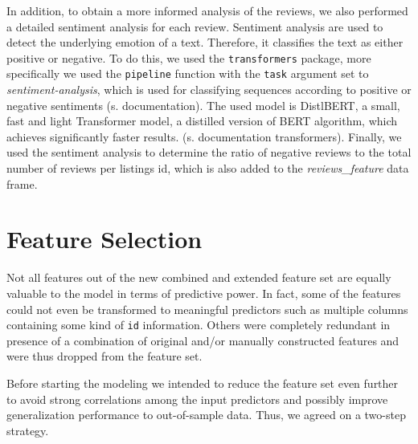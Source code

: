 \documentclass[12pt, letterpaper]{article}
\begin{document}
In addition, to obtain a more informed analysis of the reviews, we also performed a detailed sentiment analysis for each review. Sentiment analysis are used to detect the underlying emotion of a text. Therefore, it classifies the text as either positive or negative.
To do this, we used the \texttt{transformers} package, more specifically we used the \texttt{pipeline} function
with the \texttt{task} argument set to \textit{sentiment-analysis}, which is used for classifying sequences
according to positive or negative sentiments (s. documentation). The used model is DistlBERT,
a small, fast and light Transformer model, a distilled version of BERT algorithm, which achieves significantly faster results. (s. documentation transformers).
Finally, we used the sentiment analysis to determine the ratio of negative reviews to the total number of reviews per listings id, which is also added to the \textit{reviews\_feature} data frame.



\section{Feature Selection}

Not all features out of the new combined and extended feature set are equally valuable to the model in terms of predictive power.
In fact, some of the features could not even be transformed to meaningful predictors such as multiple columns containing some kind of \texttt{id} information.
Others were completely redundant in presence of a combination of original and/or manually constructed features and were thus dropped from the feature set.

Before starting the modeling we intended to reduce the feature set even further to avoid strong correlations among the input predictors and possibly improve generalization performance to out-of-sample data.
Thus, we agreed on a two-step strategy.
\end{document}
